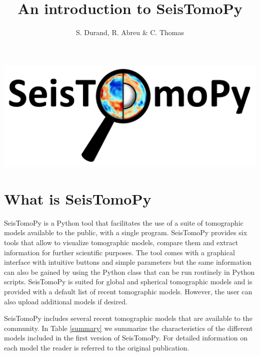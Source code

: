 \documentclass[12pt]{article}
\title{ An introduction to SeisTomoPy }
\author{S. Durand, R. Abreu \& C. Thomas}
\date{}
\begin{document}
    
\vfill
\maketitle 
\begin{center}
 \includegraphics[scale=0.8]{SeisTomoPy_notebook/figures/logo2.png}
\end{center}
\vfill



\newpage
\tableofcontents

\newpage
  
\section{What is SeisTomoPy}

SeisTomoPy is a Python tool that facilitates the use of a suite of tomographic models available to the public, with a single program. SeisTomoPy provides six tools that allow to visualize tomographic models, compare them and extract information for further scientific purposes. The tool comes with a graphical interface with intuitive buttons and simple parameters but the same information can also be gained by using the Python class that can be run routinely in Python scripts. SeisTomoPy is  suited for global and spherical tomographic models  and is provided with a default list of recent tomographic models. However, the user can also upload additional models if desired.

SeisTomoPy  includes several recent tomographic models that are available to the community. In Table \ref{summary} we summarize the characteristics of the different models included in the first version of SeisTomoPy. For detailed information on each model the reader is referred to the original publication. 
\end{document}
